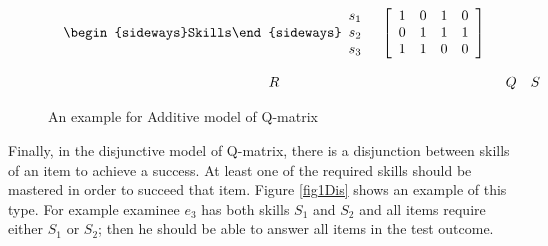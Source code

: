 \begin{figure}
\begin{footnotesize}
\[\begin{array}{ccc}
\begin{array}{cc}
\mathrm{\begin{sideways}Skills\end{sideways}}\begin{array}{c}
s_{1}\\
s_{2}\\
s_{3}
\end{array} & \left[\begin{array}{cccc}
1 & 0 & 1 & 0\\
0 & 1 & 1 & 1\\
1 & 1 & 0 & 0
\end{array}\right]
\end{array}\\
\\
R & Q & S
\end{array}
\]
 \end{footnotesize} \caption{An example for Additive model of Q-matrix}


\label{fig1Add} 
\end{figure}

Finally, in the disjunctive model of Q-matrix, there is a disjunction between skills of an item to achieve a success. At least one of the required skills should be mastered in order to succeed that item. Figure \ref{fig1Dis} shows an example of this type. For example examinee $e_{3}$ has both skills $S_{1}$ and $S_{2}$ and all items require either $S_{1}$ or $S_{2}$; then he should be able to answer all items in the test outcome. 




